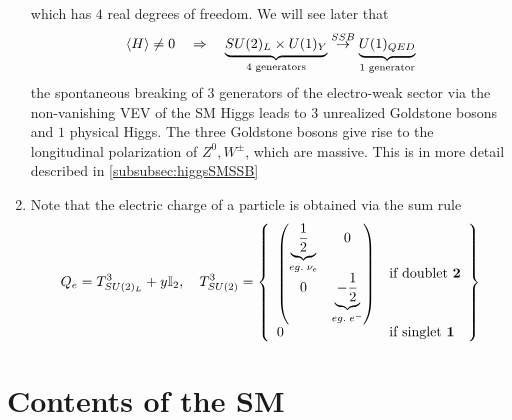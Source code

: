 \begin{enumerate}
\begin{equation}
	\end{equation}
	which has $4$ real degrees of freedom. We will see later that
	\begin{equation}
		\expval{H}\neq 0 \quad \Rightarrow \quad  \underbrace{SU(2)_L \times U(1)_Y}_{4 \text{ generators}}  \stackrel{SSB}{\rightarrow} \underbrace{U(1)_{QED}}_{1 \text{ generator}}
	\end{equation}
	the spontaneous breaking of $3$ generators of the electro-weak sector via the non-vanishing VEV of the SM Higgs leads to $3$ unrealized Goldstone bosons and $1$ physical Higgs. The three Goldstone bosons give rise to the longitudinal polarization of $Z^0, W^\pm$, which are massive. This is in more detail described in \ref{subsubsec:higgsSMSSB}
	\item Note that the electric charge of a particle is obtained via the sum rule
	\begin{equation}
		\label{eq:electricchargeSM}
		Q_{e} = T^3_{SU(2)_L} + y \mathbb{I}_2, \quad  T^3_{SU(2)}= \left\{\begin{array}{ll}
		\begin{pmatrix}
		\underbrace{\frac{1}{2}}_{eg. \; \nu_e} & 0 \\
		0 & \underbrace{- \frac{1}{2}}_{eg.\; e^-} \\
		\end{pmatrix}
		& \text{if doublet }\mathbf{2}\\
		0 & \text{if singlet }\mathbf{1}\\
		\end{array}	\right\} 
	\end{equation}
\end{enumerate}

 
 
 \section{Contents of the SM}
